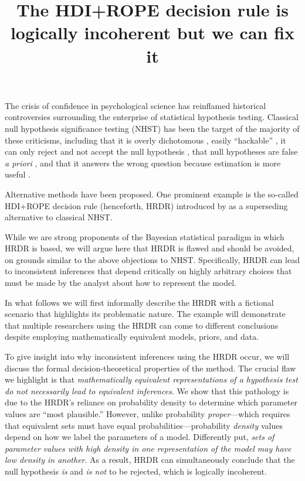 \documentclass[9pt,twocolumn,twoside]{cidlab-draft}\templatetype{cidlab-invited}
\title{The HDI+ROPE decision rule is logically incoherent but we can fix it}
\newcommand{\hdr}{HRDR}
\begin{document}
\maketitle

\noindent The crisis of confidence in psychological science has reinflamed historical controversies surrounding the enterprise of statistical hypothesis testing.  Classical null hypothesis significance testing (NHST) has been the target of the majority of these criticisms, including that it is overly dichotomous \cite{gibson2021}, easily ``hackable'' \cite{SimmonsEtAl2011}, it can only reject and not accept the null hypothesis \cite{Rouder2009ttest}, that null hypotheses are false \textit{a priori} \cite{Cohen1994,mcshane2019}, and that it answers the wrong question because estimation is more useful \cite{Cumming2014}.

Alternative methods have been proposed. One prominent example is the so-called HDI+ROPE decision rule (henceforth, \hdr{}) introduced by  as a superseding alternative to classical NHST.  

While we are strong proponents of the Bayesian statistical paradigm \cite{EtzSI,Vandekerckhove2018} in which \hdr{} is based, we will argue here that \hdr{} is flawed and should be avoided, on grounds similar to the above objections to NHST.  Specifically, \hdr{} can lead to inconsistent inferences that depend critically on highly arbitrary choices that must be made by the analyst about how to represent the model. 

In what follows we will first informally describe the \hdr{} with a fictional scenario that highlights its problematic nature. The example will demonstrate that multiple researchers using the \hdr{} can come to different conclusions despite employing mathematically equivalent models, priors, and data. 

To give insight into why inconsistent inferences using the \hdr{} occur, we will discuss the formal decision-theoretical properties of the method. The crucial flaw we highlight is that \textit{mathematically equivalent representations of a hypothesis test do not necessarily lead to equivalent inferences}. We show that this pathology is due to the \hdr{}'s reliance on probability density to determine which parameter values are ``most plausible.'' However, unlike probability \textit{proper}---which requires that equivalent sets must have equal probabilities---probability \textit{density} values depend on how we label the parameters of a model.  Differently put, \textit{sets of parameter values with high density in one representation of the model may have low density in another}. As a result, \hdr{} can simultaneously conclude that the null hypothesis \textit{is} and \textit{is not} to be rejected, which is logically incoherent.
\end{document}
